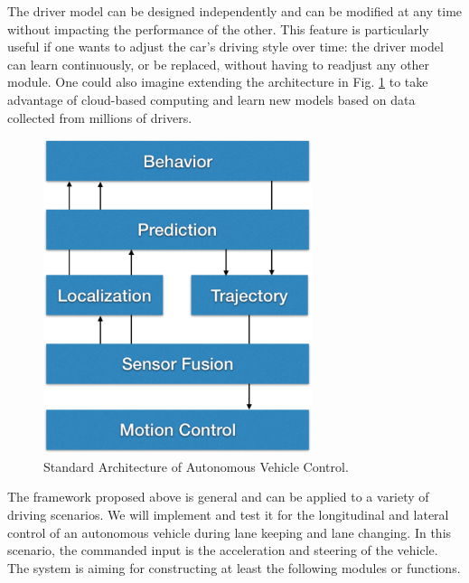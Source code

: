 The driver model can be designed independently and can be modified at any time without impacting the performance of the other. This feature is particularly useful if one wants to adjust the car's driving style over time: the driver model can learn continuously, or be replaced, without having to readjust any other module. One could also imagine extending the architecture in Fig. \ref{fig:proposed-architecture} to take advantage of cloud-based computing and learn new models based on data collected from millions of drivers.

\begin{figure}[h]
\centering
\includegraphics[width=0.7\textwidth]{figs/ch3/auto-car-flowchart}
\caption{Standard Architecture of Autonomous Vehicle Control.}
\label{fig:proposed-architecture}
\end{figure}

The framework proposed above is general and can be applied to a variety of driving scenarios. We will implement and test it for the longitudinal and lateral control of an autonomous vehicle during lane keeping and lane changing. In this scenario, the commanded input is the acceleration and steering of the vehicle. The system is aiming for constructing at least the following modules or functions.

